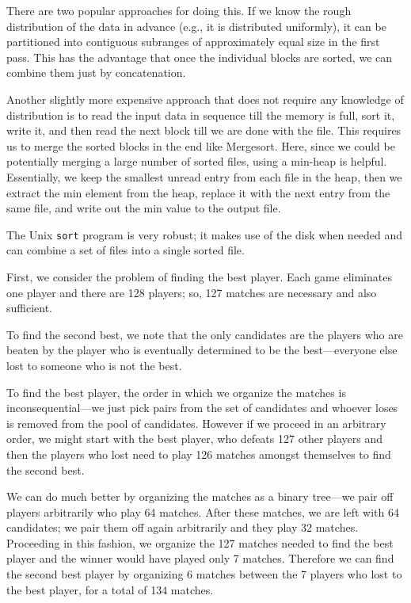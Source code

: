 There are two popular approaches for doing this. If we know the rough
distribution of the data in advance (e.g., it is distributed uniformly),
it can be partitioned into contiguous subranges of approximately equal size
 in the first pass. This has the advantage that
once the individual blocks are sorted, we can combine them
just by concatenation.

Another slightly more expensive approach that does not require any
knowledge of distribution is to read the input data in sequence till the memory is full, sort it, write it, and then read the next block till we are done with the file. This requires us to merge the sorted blocks in the end like Mergesort. Here, since we could be potentially merging a large number of sorted files, using a min-heap is
helpful. Essentially, we keep the smallest unread entry from each file
in the heap, then we extract the min element from the heap, replace
it with the next entry from the same file, and write out the min value
to the output file.

The Unix \texttt{sort} program is 
very robust; it makes use of the disk when needed and can combine
a set of files into a single sorted file.

First, we consider the problem of finding the best player.
Each game eliminates one player and there are 128 players; so, 127 matches are necessary and also sufficient.

To find the second best, we note that the only candidates are
the players who are beaten by the player who is eventually determined
to be the best---everyone else lost to someone who is not the best.

To find the best player, the order in which we organize the matches
is inconsequential---we just pick pairs from the set of 
candidates and whoever loses is removed from the pool of candidates.
However if we proceed in an arbitrary order, we might start with the
best player, who defeats 127 other players and  then the players who
lost need to
play 126 matches amongst themselves to find the second best.

We can do much better by organizing the matches as a binary tree---we pair
off players arbitrarily who play 64 matches. After these matches, we are
left with 64 candidates; we pair them off again arbitrarily and they play 32 matches.
Proceeding in this fashion, we organize the 127 matches needed to find the 
best player and the winner would have played only 7 matches. Therefore we can find the second
best player by organizing 6 matches between the 7 players who lost to the best player,
for a total of 134 matches.

